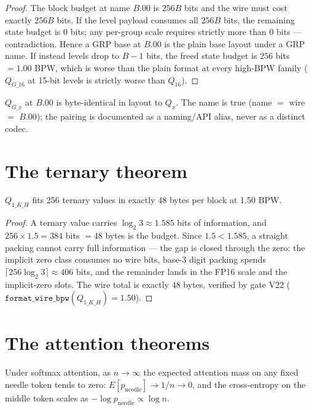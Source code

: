 \begin{proof}
The block budget at name $B.00$ is $256B$ bits and the wire must cost exactly $256B$ bits. If
the level payload consumes all $256B$ bits, the remaining state budget is $0$ bits; any
per-group scale requires strictly more than $0$ bits --- contradiction. Hence a GRP base at
$B.00$ is the plain base layout under a GRP name. If instead levels drop to $B-1$ bits, the
freed state budget is $256$ bits $= 1.00$ BPW, which is worse than the plain format at every
high-BPW family ($Q_{G\_16}$ at 15-bit levels is strictly worse than $Q_{16}$).
\end{proof}

\begin{corollary}\label{cor:alias}
$Q_{G\_x}$ at $B.00$ is byte-identical in layout to $Q_x$. The name is true (name $=$ wire $=$
$B.00$); the pairing is documented as a naming/API alias, never as a distinct codec.
\end{corollary}

\section{The ternary theorem}

\begin{theorem}\label{thm:ternary}
$Q_{1\_K\_H}$ fits 256 ternary values in exactly 48 bytes per block at 1.50 BPW.
\end{theorem}

\begin{proof}
A ternary value carries $\log_2 3 \approx 1.585$ bits of information, and $256 \times 1.5 =
384$ bits $= 48$ bytes is the budget. Since $1.5 < 1.585$, a straight packing cannot carry
full information --- the gap is closed through the zero: the implicit zero class consumes no
wire bits, base-3 digit packing spends $\lceil 256 \log_2 3 \rceil \approx 406$ bits, and the
remainder lands in the FP16 scale and the implicit-zero slots. The wire total is exactly 48
bytes, verified by gate V22 ($\texttt{format\_wire\_bpw}(Q_{1\_K\_H}) = 1.50$).
\end{proof}

\section{The attention theorems}

\begin{lemma}\label{lem:dilution}
Under softmax attention, as $n \to \infty$ the expected attention mass on any fixed needle
token tends to zero: $E[p_{\text{needle}}] \to 1/n \to 0$, and the cross-entropy on the middle
token scales as $-\log p_{\text{needle}} \propto \log n$.
\end{lemma}

